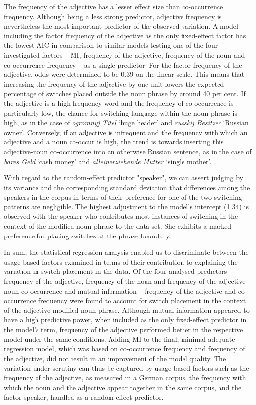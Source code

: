 The frequency of the adjective has a lesser effect size than co-occurrence frequency. Although being a less strong predictor, adjective frequency is nevertheless the most important predictor of the observed variation. A model including the factor frequency of the adjective as the only fixed-effect factor has the lowest AIC in comparison to similar models testing one of the four investigated factors -- MI, frequency of the adjective, frequency of the noun and co-occurrence frequency -- as a single predictor. For the factor frequency of the adjective, odds were determined to be 0.39 on the linear scale. This means that increasing the frequency of the adjective by one unit lowers the expected percentage of switches placed outside the noun phrase by around 40 per cent. If the adjective is a high frequency word and the frequency of co-occurrence is particularly low, the chance for switching language within the noun phrase is high, as in the case of \textit{ogromnyj Titel} `huge header' and \textit{russkij Besitzer} `Russian owner'. Conversely, if an adjective is infrequent and the frequency with which an adjective and a noun co-occur is high, the trend is towards inserting this adjective-noun co-occurrence into an otherwise Russian sentence, as in the case of \textit{bares Geld} `cash money' and \textit{alleinerziehende Mutter} `single mother'.

With regard to the random-effect predictor "speaker", we can assert judging by its variance and the corresponding standard deviation that differences among the speakers in the corpus in terms of their preference for one of the two switching patterns are negligible. The highest adjustment to the model's intercept (1.34) is observed with the speaker who contributes most instances of switching in the context of the modified noun phrase to the data set. She exhibits a marked preference for placing switches at the phrase boundary.

In sum, the statistical regression analysis enabled us to discriminate between the usage-based factors  examined in terms of their contribution to explaining the variation in switch placement in the data. Of the four analysed predictors -- frequency of the adjective, frequency of the noun and frequency of the adjective-noun co-occurrence and mutual information -- frequency of the adjective and co-occurrence frequency were found to account for switch placement in the context of the adjective-modified noun phrase. Although mutual information appeared to have a high predictive power, when included as the only fixed-effect predictor in the model's term, frequency of the adjective performed better in the respective model under the same conditions. Adding MI to the final, minimal adequate regression model, which was based on co-occurrence frequency and frequency of the adjective, did not result in an improvement of the model quality. The variation under scrutiny can thus be captured by usage-based factors such as the frequency of the adjective, as measured in a German corpus, the frequency with which the noun and the adjective appear together in the same corpus, and the factor speaker, handled as a random effect predictor.

